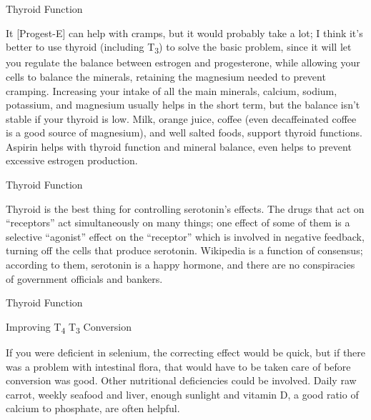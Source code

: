 \documentclass[11pt,oneside,openany,extrafontsizes]{memoir}
\begin{document}
\begin{standalonequote}{Thyroid Function}

    \begin{answer}
        It [Progest-E] can help with cramps, but it would probably take a lot; I think it's better to use thyroid (including T\textsubscript{3}) to solve the basic problem, since it will let you regulate the balance between estrogen and progesterone, while allowing your cells to balance the minerals, retaining the magnesium needed to prevent cramping. Increasing your intake of all the main minerals, calcium, sodium, potassium, and magnesium usually helps in the short term, but the balance isn't stable if your thyroid is low. Milk, orange juice, coffee (even decaffeinated coffee is a good source of magnesium), and well salted foods, support thyroid functions. Aspirin helps with thyroid function and mineral balance, even helps to prevent excessive estrogen production.
    \end{answer}
\end{standalonequote}

\begin{standalonequote}{Thyroid Function}

    \begin{answer}
        Thyroid is the best thing for controlling serotonin's effects. The drugs that act on \enquote{receptors} act simultaneously on many things; one effect of some of them is a selective \enquote{agonist} effect on the \enquote{receptor} which is involved in negative feedback, turning off the cells that produce serotonin. Wikipedia is a function of consensus; according to them, serotonin is a happy hormone, and there are no conspiracies of government officials and bankers.
    \end{answer}
\end{standalonequote}

\begin{standalonequote}{Thyroid Function}
    \begin{note}
        Improving T\textsubscript{4} \rightarrow{} T\textsubscript{3} Conversion
    \end{note}

    \begin{answer}
        If you were deficient in selenium, the correcting effect would be quick, but if there was a problem with intestinal flora, that would have to be taken care of before conversion was good. Other nutritional deficiencies could be involved. Daily raw carrot, weekly seafood and liver, enough sunlight and vitamin D, a good ratio of calcium to phosphate, are often helpful.
    \end{answer}
\end{standalonequote}
\end{document}
